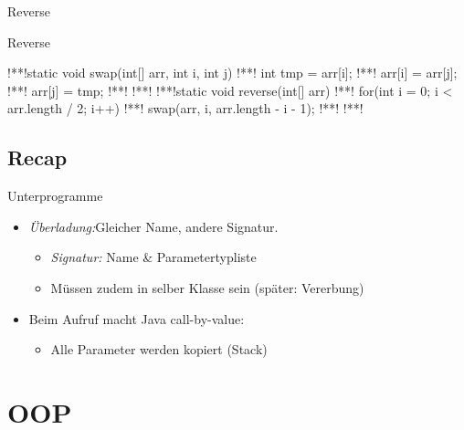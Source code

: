 {
\begin{frame}[c]{Reverse}
\flushleft{}
%
\end{frame}
\SidebarReset

\SidebarSolution
\begin{frame}[fragile,c]{Reverse}
\begin{plainjava}
!**!static void swap(int[] arr, int i, int j) {
!**!   int tmp = arr[i];
!**!   arr[i] = arr[j];
!**!   arr[j] = tmp;
!**!}
!**!
!**!static void reverse(int[] arr) {
!**!   for(int i = 0; i < arr.length / 2; i++) {
!**!      swap(arr, i, arr.length - i - 1);
!**!   }
!**!}
\end{plainjava}
\end{frame}
\SidebarReset

\subsection{Recap}
\begin{frame}[c]{\hfill Unterprogramme}
\begin{itemize}[<+(1)->]
   \itemsep18pt
   \item \textit{Überladung:}\hfill Gleicher Name, andere Signatur. \begin{itemize}
      \item \textit{Signatur:} Name \& Parametertypliste
      \item Müssen zudem in selber Klasse sein (später: Vererbung)
   \end{itemize}
   \item Beim Aufruf macht Java call-by-value: \begin{itemize}
      \item Alle Parameter werden kopiert (Stack)
   \end{itemize}
\end{itemize}
\LargeSide
\end{frame}


\section{OOP}
}
